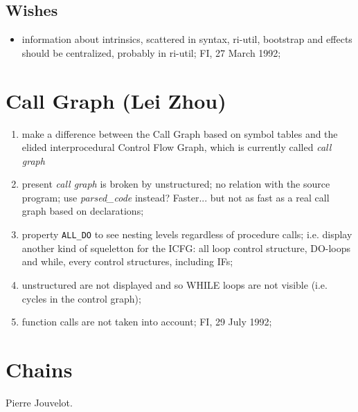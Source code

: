 \subsection{Wishes}

\begin{itemize}

  \item information about intrinsics, scattered in syntax, ri-util,
        bootstrap and effects should be centralized, probably in
        ri-util; FI, 27 March 1992;

\end{itemize}

\section{Call Graph (Lei Zhou)}

\begin{enumerate}

  \item make a difference between the Call Graph based on symbol tables
        and the elided interprocedural Control Flow Graph, which is
        currently called {\em call graph}

  \item present {\em call graph} is broken by
        unstructured; no relation with the source program; use {\em
        parsed\_code} instead? Faster... but not as fast as a real call
        graph based on declarations; 

  \item property \verb+ALL_DO+ to see nesting levels regardless of procedure
        calls; i.e. display another kind of squeletton for the ICFG:
        all loop control structure, DO-loops and while, every control
        structures, including IFs;

  \item unstructured are not displayed and so WHILE loops are not
        visible (i.e. cycles in the control graph);

  \item function calls are not taken into account; FI, 29 July 1992;

\end{enumerate}

\section{Chains}

Pierre Jouvelot.

